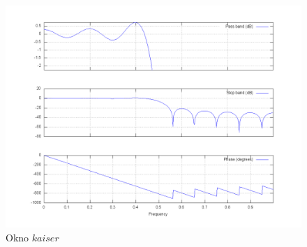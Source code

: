 \documentclass[wide,a4paper,titlepage,12pt]{mwart}
\begin{document}
	\begin{landscape}
	  \begin{figure}[htbp]
	    \begin{center}
	      \includegraphics[scale=.5]{out/fig9.png}
	      \caption{\label{fig9} Okno $kaiser$}
	    \end{center}
	  \end{figure}
	\end{landscape}
	
\end{document}
